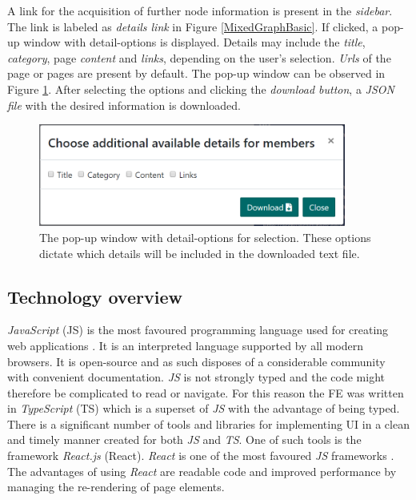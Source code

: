 A link for the acquisition of further node information is present in the \textit{sidebar}. The link is labeled as \textit{details link} in Figure \ref{MixedGraphBasic}. If clicked, a pop-up window with detail-options is displayed. Details may include the \textit{title}, \textit{category}, page \textit{content} and \textit{links}, depending on the user's selection. \textit{Urls} of the page or pages are present by default. The pop-up window can be observed in Figure \ref{detailsOptionsPopup}. After selecting the options and clicking the \textit{download button}, a \textit{JSON file} with the desired information is downloaded.
\begin{figure}[ht!]
  \centering
  \includegraphics[width=0.9\textwidth]{Images/options_popup.png}
  \caption{The pop-up window with detail-options for selection. These options dictate which details will be included in the downloaded text file.}
  \label{detailsOptionsPopup}
\end{figure} 

\subsection{Technology overview}
\textit{JavaScript} \cite{javaScript} (JS) is the most favoured programming language used for creating web applications \cite{jsGithut}. It is an interpreted language supported by all modern browsers. It is open-source and as such disposes of a considerable community with convenient documentation. \textit{JS} is not strongly typed and the code might therefore be complicated to read or navigate. For this reason the FE was written in \textit{TypeScript} (TS) \cite{typeScript} which is a superset of \textit{JS} with the advantage of being typed. There is a significant number of tools and libraries for implementing UI in a clean and timely manner created for both \textit{JS} and \textit{TS}. One of such tools is the framework \textit{React.js} \cite{react} (React). \textit{React} is one of the most favoured \textit{JS} frameworks \cite{reactPopularity}. The advantages of using \textit{React} are readable code and improved performance by managing the re-rendering of page elements.

